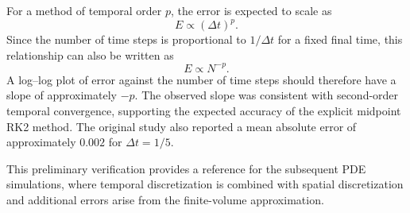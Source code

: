 For a method of temporal order $p$, the error is expected to scale as
\begin{equation}
    E\propto (\Delta t)^p.
    \label{eq:app-rk2-ode-error-dt}
\end{equation}
Since the number of time steps is proportional to $1/\Delta t$ for a fixed final time, this relationship can also be written as
\begin{equation}
    E\propto N^{-p}.
    \label{eq:app-rk2-ode-error-n}
\end{equation}
A log--log plot of error against the number of time steps should therefore have a slope of approximately $-p$. The observed slope was consistent with second-order temporal convergence, supporting the expected accuracy of the explicit midpoint RK2 method. The original study also reported a mean absolute error of approximately $0.002$ for $\Delta t=1/5$.

This preliminary verification provides a reference for the subsequent PDE simulations, where temporal discretization is combined with spatial discretization and additional errors arise from the finite-volume approximation.
